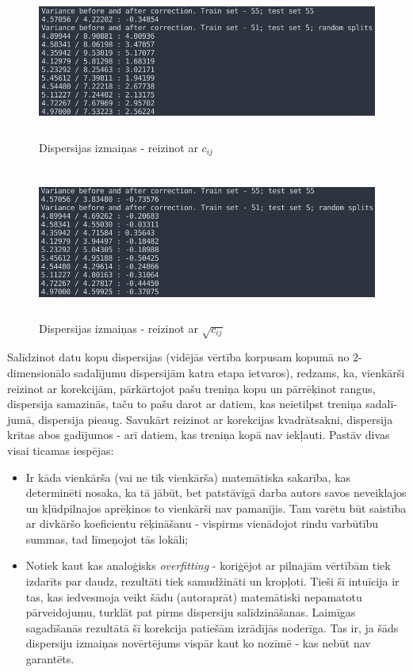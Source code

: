 \documentclass[12pt, a4paper]{article}
\begin{document}
\begin{figure}[h!]
    \centering
    \includegraphics[height=5cm]{../img/output-variance-bad.png}
    \caption{Dispersijas izmaiņas - reizinot ar $c_{ij}$}
\end{figure}
\newpage
\begin{figure}[h!]
    \centering
    \includegraphics[height=5cm,page=1]{../img/output-variance.png}
    \caption{Dispersijas izmaiņas - reizinot ar $\sqrt{c_{ij}}$}
\end{figure}

Salīdzinot datu kopu \cite{testref} dispersijas (vidējās vērtība korpusam kopumā no 2-dimensionālo sadalījumu dispersijām katra etapa ietvaros), redzams, ka, vienkārši reizinot ar korekcijām, pārkārtojot pašu treniņa kopu un pārrēķinot rangus, dispersija samazinās, taču to pašu darot ar datiem, kas neietilpst treniņa sadalī-jumā, dispersija pieaug. Savukārt reizinot ar korekcijas kvadrātsakni, dispersija krītas abos gadījumos - arī datiem, kas treniņa kopā nav iekļauti. Pastāv divas visai ticamas iespējas:

\begin{itemize}
    \item Ir kāda vienkārša (vai ne tik vienkārša) matemātiska sakarība, kas determinēti nosaka, ka tā jābūt, bet patstāvīgā darba autors savos neveiklajos un kļūdpilnajos aprēķinos to vienkārši nav pamanījis. Tam varētu būt saistība ar divkāršo koeficientu rēķināšanu - vispirms vienādojot rindu varbūtību summas, tad līmeņojot tās lokāli;
    \item Notiek kaut kas analoģisks \textit{overfitting} - koriģējot ar pilnajām vērtībām tiek izdarīts par daudz, rezultāti tiek samudžināti un kropļoti. Tieši šī intuīcija ir tas, kas iedvesmoja veikt šādu (autoraprāt) matemātiski nepamatotu pārveidojumu, turklāt pat pirms dispersiju salīdzināšanas. Laimīgas sagadīšanās rezultātā šī korekcija patiešām izrādījās noderīga. Tas ir, ja šāds dispersiju izmaiņas novērtējums vispār kaut ko nozīmē - kas nebūt nav garantēts.
\end{itemize}
\end{document}
